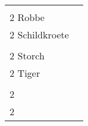 \documentclass{article}\usepackage[ngerman]{babel}\usepackage{geometry}\usepackage{lmodern}
\begin{document}
\begin{table}[p]
  \begin{tabular}{ll}    \hspace{-2em}    \fbox{\begin{minipage}[t][6cm][t]{8cm}
        \fontsize{45}{54} \selectfont
        \phantom{ }\\
      \phantom{ }2 Robbe    \end{minipage}}
    &
\fbox{\begin{minipage}[t][6cm][t]{8cm}
        \fontsize{45}{54} \selectfont
        \phantom{ }\\
        \phantom{ } 2 Schildkroete      \end{minipage}}\\    \hspace{-2em}    \fbox{\begin{minipage}[t][6cm][t]{8cm}
        \fontsize{45}{54} \selectfont
        \phantom{ }\\
      \phantom{ }2 Storch    \end{minipage}}
    &
\fbox{\begin{minipage}[t][6cm][t]{8cm}
        \fontsize{45}{54} \selectfont
        \phantom{ }\\
        \phantom{ } 2 Tiger      \end{minipage}}\\    \hspace{-2em}    \fbox{\begin{minipage}[t][6cm][t]{8cm}
        \fontsize{45}{54} \selectfont
        \phantom{ }\\
      \phantom{ }2      \end{minipage}}
    &
\fbox{\begin{minipage}[t][6cm][t]{8cm}
        \fontsize{45}{54} \selectfont
        \phantom{ }\\
        \phantom{ } 2        \end{minipage}}\\\end{tabular}
\end{table}
\end{document}
